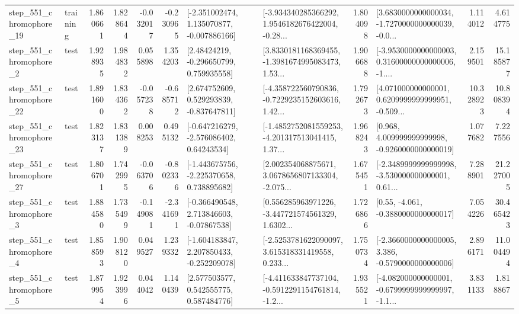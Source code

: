 \begin{tabular}{llrrrrllrlrr}
  step\_551\_chromophore\_19 &  training &      1.860661 &    1.828644 &     -0.032017 & -0.230965 &   [-2.351002474, 1.135070877, -0.007886166] &  [-3.934340285366292, 1.9546182676422004, -0.28... &       1.804098 &  [3.6830000000000034, -1.7270000000000039, -0.0... &            1.114012 &          4.614775 \\
   step\_551\_chromophore\_2 &      test &      1.928935 &    1.984832 &      0.055898 &  1.354203 &     [2.48424219, -0.296650799, 0.759935558] &  [3.8330181168369455, -1.3981674995083473, 1.53... &       1.906688 &  [-3.9530000000000003, 0.31600000000000006, -1.... &            2.159501 &         15.185877 \\
  step\_551\_chromophore\_22 &      test &      1.891600 &    1.834362 &     -0.057238 & -0.685712 &    [2.674752609, 0.529293839, -0.837647811] &  [-4.358722560790836, -0.7229235152603616, 1.42... &       1.792673 &  [4.071000000000001, 0.6209999999999951, -0.509... &           10.328923 &         10.808394 \\
  step\_551\_chromophore\_23 &      test &      1.823137 &    1.831389 &      0.008253 &  0.495132 &    [-0.647216279, -2.576086402, 0.64243534] &  [-1.4852752081559253, -4.201317513041415, 1.37... &       1.968243 &    [0.968, 4.009999999999998, -0.9260000000000019] &            1.077682 &          7.227556 \\
  step\_551\_chromophore\_27 &      test &      1.806701 &    1.742995 &     -0.063706 & -0.802336 &   [-1.443675756, -2.225370658, 0.738895682] &  [2.002354068875671, 3.0678656807133304, -2.075... &       1.675451 &  [-2.3489999999999998, -3.530000000000001, 0.61... &            7.288901 &         21.227005 \\
   step\_551\_chromophore\_3 &      test &      1.884580 &    1.735499 &     -0.149081 & -2.341691 &    [-0.366490548, 2.713846603, -0.07867538] &  [0.556285963971226, -3.447721574561329, 1.6302... &       1.726866 &                [0.55, -4.061, -0.3880000000000017] &            7.054226 &         30.465423 \\
   step\_551\_chromophore\_4 &      test &      1.858593 &    1.908120 &      0.049527 &  1.239332 &   [-1.604183847, 2.207850433, -0.252209078] &  [-2.5253781622090097, 3.615318331419558, 0.233... &       1.750734 &  [-2.3660000000000005, 3.386, -0.5790000000000006] &            2.896171 &         11.004494 \\
   step\_551\_chromophore\_5 &      test &      1.879954 &    1.923996 &      0.044042 &  1.140439 &     [2.577503577, 0.542555775, 0.587484776] &  [-4.411633847737104, -0.5912291154761814, -1.2... &       1.935521 &  [-4.082000000000001, -0.6799999999999997, -1.1... &            3.831133 &          1.818867 \\

\end{tabular}
